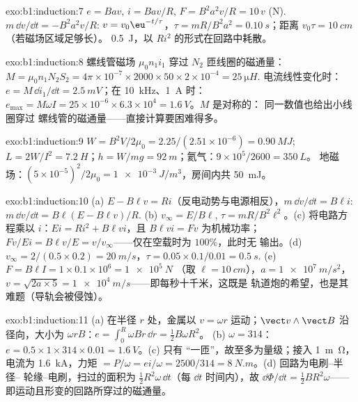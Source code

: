 \begin{solution}{exo:b1:induction:7}
$e = Bav$, $i = Bav/R$, $F = B^2a^2v/R = 10\,v$ (N). $m\,\dd v/\dd t = -B^2a^2v/R$:
$v = v_0\eu^{-t/\tau}$，$\tau = mR/B^2a^2 = \qty{0.10}{s}$；距离 $v_0\tau =
\qty{10}{cm}$（若磁场区域足够长）。
\qty{0.5}{J}，以 $Ri^2$ 的形式在回路中耗散。
\end{solution}

\begin{solution}{exo:b1:induction:8}
螺线管磁场 $\mu_0n_1i_1$ 穿过 $N_2$ 匝线圈的磁通量：$M =
\mu_0n_1N_2S_2 = 4\pi \times 10^{-7} \times 2000 \times 50 \times 2 \times 10^{-4} = \qty{25}{\micro H}$.
电流线性变化时：$e = M\,\dd i_1/\dd t = \qty{2.5}{mV}$；在 \qty{10}{kHz}、\qty{1}{A} 时：$e_{\max} =
M\omega I = 25 \times 10^{-6} \times 6.3 \times 10^4 = \qty{1.6}{V}$。$M$ 是对称的：
同一数值也给出小线圈穿过
螺线管的磁通量——直接计算要困难得多。
\end{solution}

\begin{solution}{exo:b1:induction:9}
$W = B^2V/2\mu_0 = 2.25/(2.51 \times 10^{-6}) = \qty{0.90}{MJ}$; $L = 2W/I^2 =
\qty{7.2}{H}$；$h = W/mg = \qty{92}{m}$；氦气：$9 \times 10^5/2600 = \qty{350}{L}$。
地磁场：$(5 \times 10^{-5})^2/2\mu_0 = \qty{1e-3}{J/m^3}$，房间内共
\qty{50}{mJ}。
\end{solution}

\begin{solution}{exo:b1:induction:10}
(a) $E - B\ell v = Ri$（反电动势与电源相反），$m\,\dd v/\dd t =
B\ell i$: $m\,\dd v/\dd t = B\ell(E - B\ell v)/R$. (b) $v_\infty = E/B\ell$, $\tau =
mR/B^2\ell^2$。(c) 将电路方程乘以 $i$：$Ei = Ri^2 +
B\ell vi$，且 $B\ell vi = Fv$ 为机械功率； $Fv/Ei =
B\ell v/E = v/v_\infty$——仅在空载时为 $100\%$，此时无
输出。(d) $v_\infty = 2/(0.5 \times 0.2) = \qty{20}{m/s}$，$\tau = 0.05 \times
0.1/0.01 = \qty{0.5}{s}$. (e) $F = B\ell I = 1 \times 0.1 \times 10^6 = \qty{1e5}{N}$
（取 $\ell = \qty{10}{cm}$），$a = \qty{1e7}{m/s^2}$，$v = \sqrt{2a \times 5} =
\qty{1e4}{m/s}$——即每秒十千米，这既是
轨道炮的希望，也是其难题（导轨会被侵蚀）。
\end{solution}

\begin{solution}{exo:b1:induction:11}
(a) 在半径 $r$ 处，金属以 $v = \omega r$ 运动；$\vect v\wedge\vect B$ 沿
径向，大小为 $\omega rB$：$e = \int_0^R\omega Br\,\dd r = \tfrac12B\omega R^2$。
(b) $\omega = 314$：$e = 0.5 \times 1 \times 314 \times 0.01 = \qty{1.6}{V}$。(c) 只有
“一匝”，故至多为量级；接入 \qty{1}{m\ohm}，电流为 \qty{1.6}{kA}，力矩
$= P/\omega = ei/\omega = 2500/314 = \qty{8}{N.m}$。(d) 回路为电刷–半径--
轮缘–电刷，扫过的面积为 $\tfrac12R^2\omega\,\dd t$（每 $\dd t$ 时间内），故 $\dd\Phi/\dd t =
\tfrac12BR^2\omega$——即运动且形变的回路所穿过的磁通量。
\end{solution}

